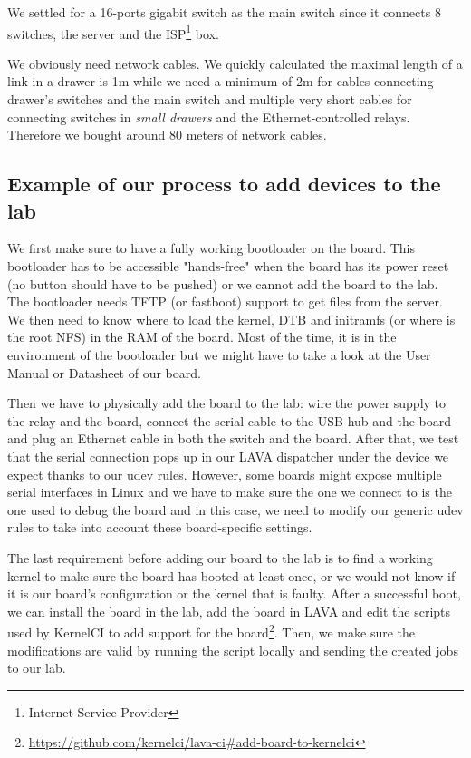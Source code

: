 We settled for a 16-ports gigabit switch as the main switch since it connects 8 switches, the server and the ISP\footnote{Internet Service Provider} box.

We obviously need network cables. We quickly calculated the maximal length of a link in a drawer is 1m while we need a minimum of 2m for cables connecting drawer's switches and the main switch and multiple very short cables for connecting switches in \textit{small drawers} and the Ethernet-controlled relays. Therefore we bought around 80 meters of network cables.

\subsection{Example of our process to add devices to the lab}

We first make sure to have a fully working bootloader on the board. This bootloader has to be accessible "hands-free" when the board has its power reset (no button should have to be pushed) or we cannot add the board to the lab. The bootloader needs TFTP (or fastboot) support to get files from the server. We then need to know where to load the kernel, DTB and initramfs (or where is the root NFS) in the RAM of the board. Most of the time, it is in the environment of the bootloader but we might have to take a look at the User Manual or Datasheet of our board.

Then we have to physically add the board to the lab: wire the power supply to the relay and the board, connect the serial cable to the USB hub and the board and plug an Ethernet cable in both the switch and the board. After that, we test that the serial connection pops up in our LAVA dispatcher under the device we expect thanks to our udev rules. However, some boards might expose multiple serial interfaces in Linux and we have to make sure the one we connect to is the one used to debug the board and in this case, we need to modify our generic udev rules to take into account these board-specific settings.

The last requirement before adding our board to the lab is to find a working kernel to make sure the board has booted at least once, or we would not know if it is our board's configuration or the kernel that is faulty. After a successful boot, we can install the board in the lab, add the board in LAVA and edit the scripts used by KernelCI to add support for the board\footnote{\url{https://github.com/kernelci/lava-ci\#add-board-to-kernelci}}. Then, we make sure the modifications are valid by running the script locally and sending the created jobs to our lab.

